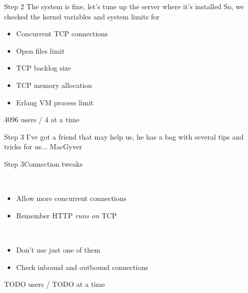 \documentclass[utf8]{beamer}
\begin{document}
\begin{frame}{Step 2}
The system is fine, let's tune up the server where it's installed
\pause
So, we checked the kernel variables and system limits for
\begin{itemize}
	\item<+-> Concurrent TCP connections
	\item<+-> Open files limit
	\item<+-> TCP backlog size
	\item<+-> TCP memory allocation
	\item<+-> Erlang VM process limit
\end{itemize}
\end{frame}

\begin{frame}
4096 users / 4 at a time
\end{frame}

\begin{frame}{Step 3}
I've got a friend that may help us, he has a bag with several tips and tricks for us...
\pause
MacGyver
\end{frame}

\begin{frame}{Step 3}{Connection tweaks}
	\begin{description}
		\item<+->[Backlog]\ \\
			\begin{itemize}
				\item Allow more concurrent connections
				\item Remember HTTP \emph{runs on} TCP
			\end{itemize}
		\item<+->[Connections]\ \\
			\begin{itemize}
				\item Don't use just one of them
				\item Check inbound and outbound connections
			\end{itemize}
	\end{description}
\end{frame}

\begin{frame}
TODO users / TODO at a time
\end{frame}
\end{document}
